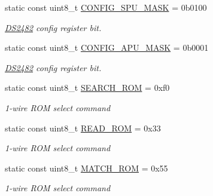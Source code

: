 \begin{DoxyCompactItemize}
\mbox{\label{class_d_s2482_command_aae390ea7aa76eceda59330ebdfe06e33}} 
static const uint8\+\_\+t \mbox{\hyperlink{class_d_s2482_command_aae390ea7aa76eceda59330ebdfe06e33}{C\+O\+N\+F\+I\+G\+\_\+\+S\+P\+U\+\_\+\+M\+A\+SK}} = 0b0100
\begin{DoxyCompactList}\small\item\em \mbox{\hyperlink{class_d_s2482}{D\+S2482}} config register bit. \end{DoxyCompactList}\item 
\mbox{\label{class_d_s2482_command_a06b13e68850523d12da47b6b106acc19}} 
static const uint8\+\_\+t \mbox{\hyperlink{class_d_s2482_command_a06b13e68850523d12da47b6b106acc19}{C\+O\+N\+F\+I\+G\+\_\+\+A\+P\+U\+\_\+\+M\+A\+SK}} = 0b0001
\begin{DoxyCompactList}\small\item\em \mbox{\hyperlink{class_d_s2482}{D\+S2482}} config register bit. \end{DoxyCompactList}\item 
\mbox{\label{class_d_s2482_command_aab4578032c73a9aa17dacbc0e7ca0d6e}} 
static const uint8\+\_\+t \mbox{\hyperlink{class_d_s2482_command_aab4578032c73a9aa17dacbc0e7ca0d6e}{S\+E\+A\+R\+C\+H\+\_\+\+R\+OM}} = 0xf0
\begin{DoxyCompactList}\small\item\em 1-\/wire R\+OM select command \end{DoxyCompactList}\item 
\mbox{\label{class_d_s2482_command_a4ab109c6e299de83ec70028ea7e3d709}} 
static const uint8\+\_\+t \mbox{\hyperlink{class_d_s2482_command_a4ab109c6e299de83ec70028ea7e3d709}{R\+E\+A\+D\+\_\+\+R\+OM}} = 0x33
\begin{DoxyCompactList}\small\item\em 1-\/wire R\+OM select command \end{DoxyCompactList}\item 
\mbox{\label{class_d_s2482_command_a3eb31038b5e078d1c3a9e4957bcc9851}} 
static const uint8\+\_\+t \mbox{\hyperlink{class_d_s2482_command_a3eb31038b5e078d1c3a9e4957bcc9851}{M\+A\+T\+C\+H\+\_\+\+R\+OM}} = 0x55
\begin{DoxyCompactList}\small\item\em 1-\/wire R\+OM select command \end{DoxyCompactList}\item 

\end{DoxyCompactItemize}
